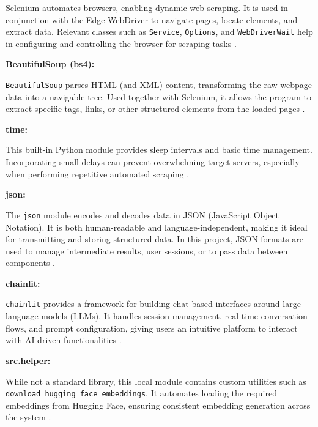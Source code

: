 \noindent
Selenium automates browsers, enabling dynamic web scraping. It is used in conjunction with the Edge WebDriver
to navigate pages, locate elements, and extract data. Relevant classes such as \texttt{Service}, \texttt{Options}, 
and \texttt{WebDriverWait} help in configuring and controlling the browser for scraping tasks \cite{selenium}.

\vspace{0.4cm}
\noindent\textbf{BeautifulSoup (bs4):}

\noindent
\texttt{BeautifulSoup} parses HTML (and XML) content, transforming the raw webpage data into a navigable tree. 
Used together with Selenium, it allows the program to extract specific tags, links, or other structured elements 
from the loaded pages \cite{beautifulsoup}.

\vspace{0.4cm}
\noindent\textbf{time:}

\noindent
This built-in Python module provides sleep intervals and basic time management. Incorporating small delays can prevent 
overwhelming target servers, especially when performing repetitive automated scraping \cite{time}.

\vspace{0.4cm}
\noindent\textbf{json:}

\noindent
The \texttt{json} module encodes and decodes data in JSON (JavaScript Object Notation). It is both human-readable
and language-independent, making it ideal for transmitting and storing structured data. In this project, JSON 
formats are used to manage intermediate results, user sessions, or to pass data between components \cite{json}.

\vspace{0.4cm}
\noindent\textbf{chainlit:}

\noindent
\texttt{chainlit} provides a framework for building chat-based interfaces around large language models (LLMs). 
It handles session management, real-time conversation flows, and prompt configuration, giving users an 
intuitive platform to interact with AI-driven functionalities \cite{chainlit}.

\vspace{0.4cm}
\noindent\textbf{src.helper:}

\noindent
While not a standard library, this local module contains custom utilities such as \texttt{download\_hugging\_face\_embeddings}. 
It automates loading the required embeddings from Hugging Face, ensuring consistent embedding generation 
across the system \cite{pinecone}.

